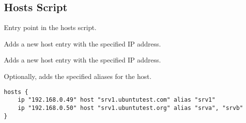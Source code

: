 \subsection{Hosts Script}




Entry point in the hosts script.


Adds a new host entry with the specified IP address.


Adds a new host entry with the specified IP address.


Optionally, adds the specified aliases for the host.

\begin{lstlisting}[style=Sscontrol,
label={lst:hosts_example_script},
title={Adds IP addresses and the host name.}]
hosts {
    ip "192.168.0.49" host "srv1.ubuntutest.com" alias "srv1"
    ip "192.168.0.50" host "srv1.ubuntutest.org" alias "srva", "srvb"
}
\end{lstlisting}

